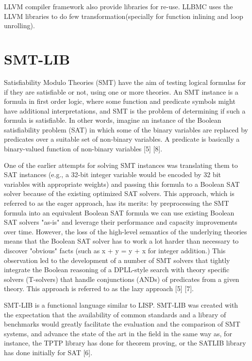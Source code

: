 \documentclass[14pt]{article}
\begin{document}
LLVM compiler framework also provide libraries for re-use.  LLBMC uses the LLVM libraries to do few transformation(specially for  function inlining and loop unrolling). 

\section{SMT-LIB}\label{SMT-LIB}
Satisfiability Modulo Theories (SMT) have the aim of testing logical formulas for if they are satisfiable or not, using one or more theories. An SMT instance is a formula in first order logic, where some function and predicate symbols might have additional interpretations, and SMT is the problem of determining if such a formula is satisfiable. In other words, imagine an instance of the Boolean satisfiability problem (SAT) in which some of the binary variables are replaced by predicates over a suitable set of non-binary variables. A predicate is basically a binary-valued function of non-binary variables [5] [8].
					
One of the earlier attempts for solving SMT instances was translating them to SAT instances (e.g., a 32-bit integer variable would be encoded by 32 bit variables with appropriate weights) and passing this formula to a Boolean SAT solver because of the existing optimized SAT solvers. This approach, which is referred to as the eager approach, has its merits: by preprocessing the SMT formula into an equivalent Boolean SAT formula we can use existing Boolean SAT solvers "as-is" and leverage their performance and capacity improvements over time. However, the loss of the high-level semantics of the underlying theories means that the Boolean SAT solver has to work a lot harder than necessary to discover "obvious" facts (such as x + y = y + x for integer addition.) This observation led to the development of a number of SMT solvers that tightly integrate the Boolean reasoning of a DPLL-style search with theory specific solvers (T-solvers) that handle conjunctions (ANDs) of predicates from a given theory. This approach is referred to as the lazy approach [5] [7]. 

SMT-LIB is a functional language similar to LISP. SMT-LIB was created with the expectation that the availability of common standards and a library of benchmarks would greatly facilitate the evaluation and the comparison of SMT systems, and advance the state of the art in the field in the same way as, for instance, the TPTP library has done for theorem proving, or the SATLIB library has done initially for SAT [6]. 
\end{document}
